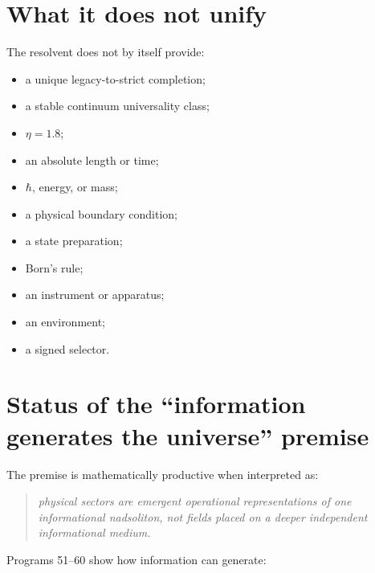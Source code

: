 \documentclass[11pt,a4paper,openany]{report}
\begin{document}
\section{What it does not unify}

The resolvent does not by itself provide:

\begin{itemize}
\item 
a unique legacy-to-strict completion;

\item 
a stable continuum universality class;

\item 
\(\eta=1.8\);

\item 
an absolute length or time;

\item 
\(\hbar\), energy, or mass;

\item 
a physical boundary condition;

\item 
a state preparation;

\item 
Born’s rule;

\item 
an instrument or apparatus;

\item 
an environment;

\item 
a signed selector.

\end{itemize}

\section{Status of the “information generates the universe” premise}

The premise is mathematically productive when interpreted as:

\begin{quote}\itshape
physical sectors are emergent operational representations of one informational nadsoliton, not fields placed on a deeper independent informational medium.

\end{quote}

Programs 51–60 show how information can generate:
\end{document}
